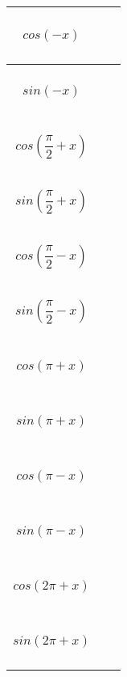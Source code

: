 \documentclass[11pt,landscape]{article}
\begin{document}

\setlength{\columnseprule}{1pt}
\begin{multicols}{4}
  \begin{center}
    \begin{tabular}{| c | m{2cm} |}
      \hline
      $cos(-x) \phantom{\dfrac{\dfrac{x}{x}}{\dfrac{x}{x}}}$                 & \tabularnewline
      \hline
      $sin(-x) \phantom{\dfrac{\dfrac{x}{x}}{\dfrac{x}{x}}}$                 & \tabularnewline
      \hline\hline 
      $cos(\dfrac{\pi}{2} + x) \phantom{\dfrac{\dfrac{x}{x}}{\dfrac{x}{x}}}$ & \tabularnewline
      \hline  
      $sin(\dfrac{\pi}{2} + x) \phantom{\dfrac{\dfrac{x}{x}}{\dfrac{x}{x}}}$ & \tabularnewline
      \hline\hline
      $cos(\dfrac{\pi}{2} - x) \phantom{\dfrac{\dfrac{x}{x}}{\dfrac{x}{x}}}$ & \tabularnewline
      \hline
      $sin(\dfrac{\pi}{2} - x) \phantom{\dfrac{\dfrac{x}{x}}{\dfrac{x}{x}}}$ & \tabularnewline
      \hline\hline
      $cos(\pi + x) \phantom{\dfrac{\dfrac{x}{x}}{\dfrac{x}{x}}}$            & \tabularnewline
      \hline
      $sin(\pi + x) \phantom{\dfrac{\dfrac{x}{x}}{\dfrac{x}{x}}}$            & \tabularnewline
      \hline\hline
      $cos(\pi - x) \phantom{\dfrac{\dfrac{x}{x}}{\dfrac{x}{x}}}$            & \tabularnewline
      \hline
      $sin(\pi - x) \phantom{\dfrac{\dfrac{x}{x}}{\dfrac{x}{x}}}$            & \tabularnewline
      \hline\hline
      $cos(2 \pi + x) \phantom{\dfrac{\dfrac{x}{x}}{\dfrac{x}{x}}}$          & \tabularnewline
      \hline
      $sin(2 \pi + x) \phantom{\dfrac{\dfrac{x}{x}}{\dfrac{x}{x}}}$          & \tabularnewline
      \hline
    \end{tabular}
  \end{center}


\end{multicols}
\end{document}
